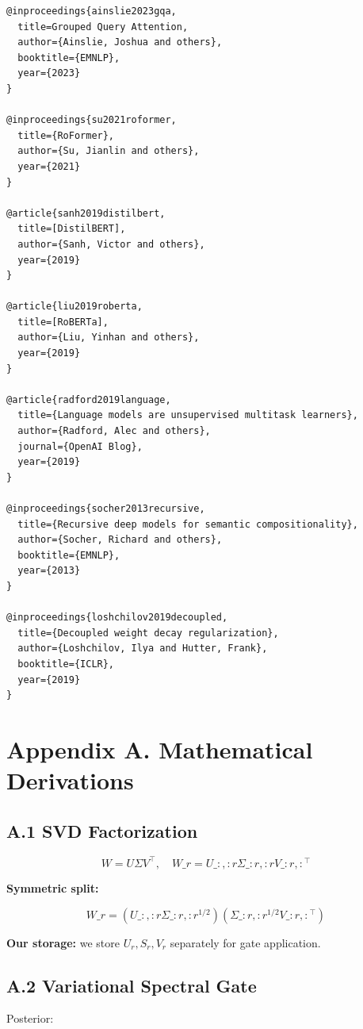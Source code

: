 \begin{lstlisting}
@inproceedings{ainslie2023gqa,
  title=Grouped Query Attention,
  author={Ainslie, Joshua and others},
  booktitle={EMNLP},
  year={2023}
}

@inproceedings{su2021roformer,
  title={RoFormer},
  author={Su, Jianlin and others},
  year={2021}
}

@article{sanh2019distilbert,
  title=[DistilBERT],
  author={Sanh, Victor and others},
  year={2019}
}

@article{liu2019roberta,
  title=[RoBERTa],
  author={Liu, Yinhan and others},
  year={2019}
}

@article{radford2019language,
  title={Language models are unsupervised multitask learners},
  author={Radford, Alec and others},
  journal={OpenAI Blog},
  year={2019}
}

@inproceedings{socher2013recursive,
  title={Recursive deep models for semantic compositionality},
  author={Socher, Richard and others},
  booktitle={EMNLP},
  year={2013}
}

@inproceedings{loshchilov2019decoupled,
  title={Decoupled weight decay regularization},
  author={Loshchilov, Ilya and Hutter, Frank},
  booktitle={ICLR},
  year={2019}
}
\end{lstlisting}



\section{Appendix A. Mathematical Derivations}

\subsection{A.1 SVD Factorization}

\[
W = U \Sigma V^\top, \quad W\_r = U\_{:, :r} \Sigma\_{:r, :r} V\_{:r, :}^\top
\tag{A.1}
\]

\textbf{Symmetric split:}

\[
W\_r = (U\_{:, :r} \Sigma\_{:r, :r}^{1/2}) (\Sigma\_{:r, :r}^{1/2} V\_{:r, :}^\top)
\tag{A.2}
\]

\textbf{Our storage:} we store $U_r, S_r, V_r$ separately for gate application.

\subsection{A.2 Variational Spectral Gate}

Posterior:


